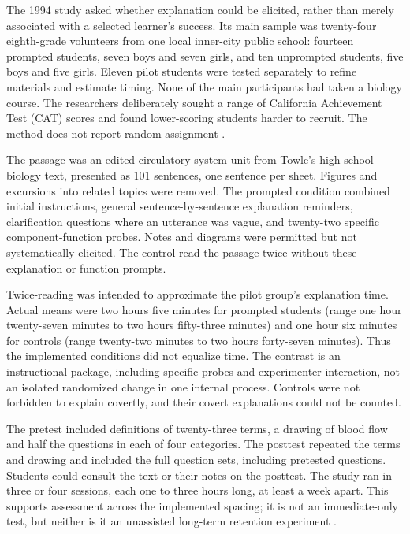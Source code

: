 The 1994 study asked whether explanation could be elicited, rather than
merely associated with a selected learner's success. Its main sample was
twenty-four eighth-grade volunteers from one local inner-city public school:
fourteen prompted students, seven boys and seven girls, and ten unprompted
students, five boys and five girls. Eleven pilot students were tested
separately to refine materials and estimate timing. None of the main
participants had taken a biology course. The researchers deliberately sought
a range of California Achievement Test (CAT) scores and found lower-scoring
students harder to recruit. The method does not report random assignment
\cite[pp.~443--451]{ChiEtAl1994Eliciting}.

The passage was an edited circulatory-system unit from Towle's high-school
biology text, presented as 101 sentences, one sentence per sheet. Figures
and excursions into related topics were removed. The prompted condition
combined initial instructions, general sentence-by-sentence explanation
reminders, clarification questions where an utterance was vague, and
twenty-two specific component-function probes. Notes and diagrams were
permitted but not systematically elicited. The control read the passage
twice without these explanation or function prompts.

Twice-reading was intended to approximate the pilot group's explanation
time. Actual means were two hours five minutes for prompted students
(range one hour twenty-seven minutes to two hours fifty-three minutes)
and one hour six minutes for controls (range twenty-two minutes to two
hours forty-seven minutes). Thus
the implemented conditions did not equalize time. The contrast is an
instructional package, including specific probes and experimenter
interaction, not an isolated randomized change in one internal process.
Controls were not forbidden to explain covertly, and their covert
explanations could not be counted.

The pretest included definitions of twenty-three terms, a drawing of blood
flow and half the questions in each of four categories. The posttest
repeated the terms and drawing and included the full question sets,
including pretested questions. Students could consult the text or their
notes on the posttest. The study ran in three or four sessions, each one
to three hours long, at least a week apart. This supports assessment across
the implemented spacing; it is not an immediate-only test, but neither
is it an unassisted long-term retention experiment
\cite[pp.~450--452]{ChiEtAl1994Eliciting}.

